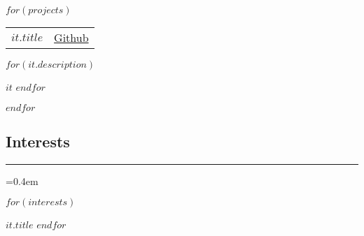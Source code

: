 \documentclass[10pt,letterpaper]{article}
\makeatletter
\def\sectionSpace{\vspace{-10pt}}
\newcommand\resumesection[1]
{\subsection*{#1}
\vspace{-0.2em}
\hrule
\vspace{0.4em}}
\newcommand{\headerrow}[2]
{\begin{tabular*}{\linewidth}{l@{\extracolsep{\fill}}r}
    #1 &
	#2 \\
\end{tabular*}}
\makeatother
\begin{document}
    $for(projects)$
    \headerrow
		{\textbf{$it.title$}}
        {\href{$it.url$}{Github}}
    \vspace{-16pt}
	\begin{itemize*}
        $for(it.description)$
	    \item $it$
        $endfor$
	\end{itemize*}
	\vspace{-2pt}
    $endfor$
	\sectionSpace

\resumesection{Interests}
\parskip=0.4em

    \begin{itemize*}
        $for(interests)$
        \item $it.title$
        $endfor$
    \end{itemize*}
\end{document}
